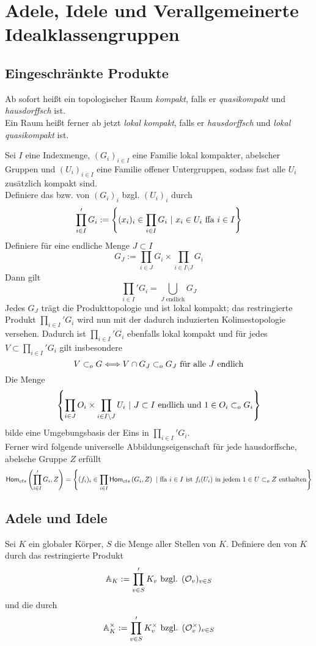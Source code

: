 \chapter{Adele, Idele und Verallgemeinerte Idealklassengruppen}
\section{Eingeschränkte Produkte}
\Bem{}
Ab sofort heißt ein topologischer Raum \textit{kompakt}, falls er \textit{quasikompakt} und \textit{hausdorffsch} ist.\\
Ein Raum heißt ferner ab jetzt \textit{lokal kompakt}, falls er \textit{hausdorffsch} und \textit{lokal quasikompakt} ist.

Sei $I$ eine Indexmenge, $(G_i)_{i\in I}$ eine Familie lokal kompakter, abelscher Gruppen und $(U_i)_{i\in I}$ eine Familie offener Untergruppen, sodass fast alle $U_i$ zusätzlich kompakt sind.\\
Definiere das  bzw.  von $(G_i)_i$ bzgl. $(U_i)_i$ durch
\[ \prod_{i\in I}'G_i := \set{(x_i)_i \in \prod_{i\in I}G_i}{ x_i \in U_i \text{ ffa } i \in I } \]
Definiere für eine endliche Menge $J \subset I$
\[ G_J := \prod_{i \in J}G_i \times \prod_{i \in I\setminus J} G_i \]
Dann gilt
\[ \prod_{i\in I}'G_i = \bigcup_{J \text{ endlich}}G_J  \]
Jedes $G_J$ trägt die Produkttopologie und ist lokal kompakt; das restringierte Produkt $\prod_{i\in I}'G_i$ wird nun mit der dadurch induzierten Kolimestopologie versehen. Dadurch ist $\prod_{i\in I}'G_i$ ebenfalls lokal kompakt und für jedes $V \subset \prod_{i\in I}'G_i$ gilt insbesondere
\[ V \subset_o G \overset{}{\Longleftrightarrow} V\cap G_J \subset_o G_J \text{ für alle }J \text{ endlich} \]
Die Menge
\[ \set{ \prod_{i \in J}O_i \times \prod_{i \in I\setminus J}U_i }{J \subset I \text{ endlich und } 1 \in O_i \subset_o G_i} \]
bilde eine Umgebungsbasis der Eins in $\prod_{i\in I}'G_i$.\\
Ferner wird folgende universelle Abbildungseigenschaft für jede hausdorffsche, abelsche Gruppe $Z$ erfüllt
\[ \Hom{cts}{\prod_{i\in I}'G_i}{Z} = \set{(f_i)_i \in \prod_{i \in I} \Hom{cts}{G_i}{Z} }{ \text{ffa } i \in I \text{ ist } f_i(U_i) \text{ in jedem }1 \in U\subset_o Z \text{ enthalten} } \]


\section{Adele und Idele}
Sei $K$ ein globaler Körper, $S$ die Menge aller Stellen von $K$. Definiere den  von $K$ durch das restringierte Produkt
\[ \mathbb{A}_K := \prod'_{v\in S} K_v \text{ bzgl. } (\mathcal{O}_v)_{v\in S} \]
und die  durch
\[ \mathbb{A}_K^\times := \prod'_{v\in S}K_v^\times \text{ bzgl. } (\mathcal{O}_v^\times)_{v\in S} \]

